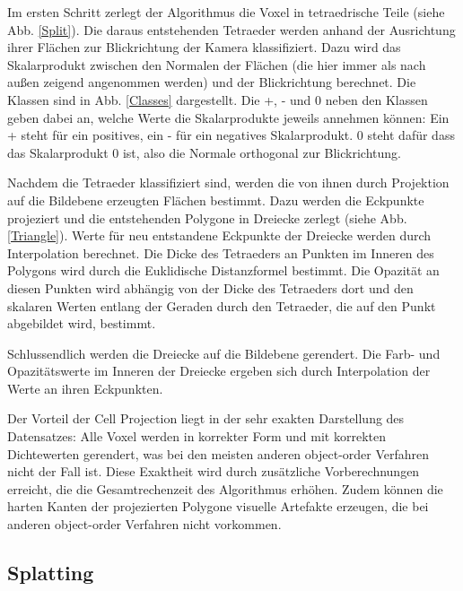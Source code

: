 \documentclass[a4paper,fontsize=12pt,toc=bib,halfparskip]{scrartcl}
\begin{document}
Im ersten Schritt zerlegt der Algorithmus die Voxel in tetraedrische Teile (siehe Abb. \ref{Split}). Die daraus entstehenden Tetraeder werden anhand der Ausrichtung ihrer Fl\"achen zur Blickrichtung der Kamera klassifiziert. Dazu wird das Skalarprodukt zwischen den Normalen der Fl\"achen (die hier immer als nach au{\ss}en zeigend angenommen werden) und der Blickrichtung berechnet. Die Klassen sind in Abb. \ref{Classes} dargestellt. Die +, - und 0 neben den Klassen geben dabei an, welche Werte die Skalarprodukte jeweils annehmen k\"onnen: Ein + steht f\"ur ein positives, ein - f\"ur ein negatives Skalarprodukt. 0 steht daf\"ur dass das Skalarprodukt 0 ist, also die Normale orthogonal zur Blickrichtung.

Nachdem die Tetraeder klassifiziert sind, werden die von ihnen durch Projektion auf die Bildebene erzeugten Fl\"achen bestimmt. Dazu werden die Eckpunkte projeziert und die entstehenden Polygone in Dreiecke zerlegt (siehe Abb. \ref{Triangle}). Werte f\"ur neu entstandene Eckpunkte der Dreiecke werden durch Interpolation berechnet. Die Dicke des Tetraeders an Punkten im Inneren des Polygons wird durch die Euklidische Distanzformel bestimmt. Die Opazit\"at an diesen Punkten wird abh\"angig von der Dicke des Tetraeders dort und den skalaren Werten entlang der Geraden durch den Tetraeder, die auf den Punkt abgebildet wird, bestimmt.

Schlussendlich werden die Dreiecke auf die Bildebene gerendert. Die Farb- und Opazit\"atswerte im Inneren der Dreiecke ergeben sich durch Interpolation der Werte an ihren Eckpunkten. 

Der Vorteil der Cell Projection liegt in der sehr exakten Darstellung des Datensatzes: Alle Voxel werden in korrekter Form und mit korrekten Dichtewerten gerendert, was bei den meisten anderen object-order Verfahren nicht der Fall ist. Diese Exaktheit wird durch zus\"atzliche Vorberechnungen erreicht, die die Gesamtrechenzeit des Algorithmus erh\"ohen. Zudem k\"onnen die harten Kanten der projezierten Polygone visuelle Artefakte erzeugen, die bei anderen object-order Verfahren nicht vorkommen.

\subsection{Splatting}
\end{document}
